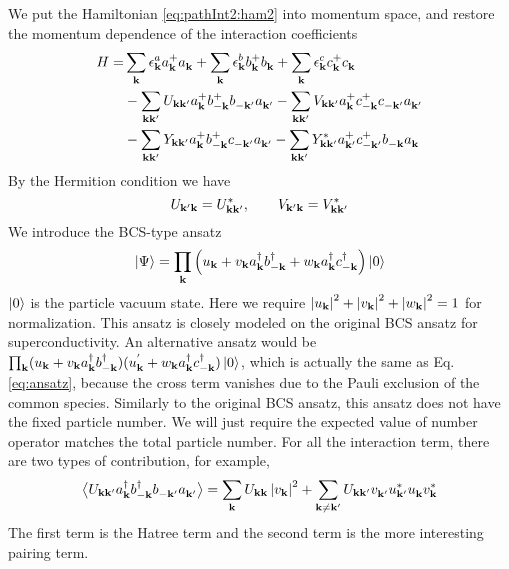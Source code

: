 We put the Hamiltonian \ref{eq:pathInt2:ham2} into momentum space, and restore the momentum dependence of the interaction coefficients
\begin{equation}\label{eq:uvw:hamiltonian}
\begin{split}
 H=&\sum_{\mathbf{k}}\epsilon^a_{\mathbf{k}}{}a^+_{\mathbf{k}}{}a^{}_{\mathbf{k}}+\sum_{\mathbf{k}}\epsilon^b_{\mathbf{k}}{}b^+_{\mathbf{k}}{}b^{}_{\mathbf{k}}+\sum_{\mathbf{k}}\epsilon^c_{\mathbf{k}}{}c^+_{\mathbf{k}}{}c^{}_{\mathbf{k}}\\
  &-\sum_{\mathbf{k}\mathbf{k}'}U_{\mathbf{k}\mathbf{k}'}a^+_{\mathbf{k}}{}b^+_{-\mathbf{k}}{}b^{}_{-\mathbf{k}'}a^{}_{\mathbf{k}'}
	-\sum_{\mathbf{k}\mathbf{k}'}V_{\mathbf{k}\mathbf{k}'}a^+_{\mathbf{k}}{}c^+_{-\mathbf{k}}{}c^{}_{-\mathbf{k}'}a^{}_{\mathbf{k}'}\\
 &-\sum_{\mathbf{k}\mathbf{k}'}Y_{\mathbf{k}\mathbf{k}'}a^+_{\mathbf{k}}{}b^+_{-\mathbf{k}}{}c^{}_{-\mathbf{k}'}a^{}_{\mathbf{k}'}
	-\sum_{\mathbf{k}\mathbf{k}'}Y^*_{\mathbf{k}\mathbf{k}'}a^+_{\mathbf{k}'}{}c^+_{-\mathbf{k}'}{}b^{}_{-\mathbf{k}}a^{}_{\mathbf{k}}
\end{split} 
\end{equation}
By the Hermition condition we have 
\begin{equation}
 U_{\mathbf{k}'\mathbf{k}}=U^*_{\mathbf{k}\mathbf{k}'},\qquad{} V_{\mathbf{k}'\mathbf{k}}=V^*_{\mathbf{k}\mathbf{k}'}
\end{equation}
  We introduce the BCS-type ansatz 
\begin{equation}\label{eq:ansatz}
 \left|\Psi\right>=\prod_{\mathbf{k}}\left(u_{\mathbf{k}}+v_{\mathbf{k}}{}a^{\dagger}_{\mathbf{k}}{}b^{\dagger}_{-\mathbf{k}}+w_{\mathbf{k}}{}a^{\dagger}_{\mathbf{k}}{}c^{\dagger}_{-\mathbf{k}}\right)\left|0\right>
\end{equation}
$\left|0\right>$ is the particle vacuum state.  Here we require $\left\lvert{u_{\ensuremath{\mathbf{k}}}}\right\rvert^2+\left\lvert{v_{\ensuremath{\mathbf{k}}}}\right\rvert^2+\left\lvert{w_{\ensuremath{\mathbf{k}}}}\right\rvert^2=1$ for normalization.  This ansatz is closely modeled on the original BCS ansatz for superconductivity.  An alternative ansatz would be $\prod_{\mathbf{k}}(u_{\mathbf{k}}+v_{\mathbf{k}}{}a^{\dagger}_{\mathbf{k}}{}b^{\dagger}_{-\mathbf{k}})(u^{'}_{\mathbf{k}}+w_{\mathbf{k}}{}a^{\dagger}_{\mathbf{k}}{}c^{\dagger}_{-\mathbf{k}})\left|0\right>$, which is actually the same as Eq. \ref{eq:ansatz}, because  the cross term vanishes due to the Pauli exclusion of the common species.   Similarly to the original BCS ansatz, this ansatz does not have the fixed particle number.  We  will just require the expected value of number operator matches the total particle number. For all the interaction term, there are two types of contribution,
for example, 
\begin{equation*}
\bigl<{U_{\mathbf{k}\mathbf{k}'}a^{\dagger}_{\mathbf{k}}{}b^{\dagger}_{-\mathbf{k}}{}b^{}_{-\mathbf{k}'}a^{}_{\mathbf{k}'}}\bigr>
=\sum_{\mathbf{k}}U_{\mathbf{k}\mathbf{k}}\left\lvert{v_{\ensuremath{\mathbf{k}}}}\right\rvert^2+\sum_{\mathbf{k}\neq\mathbf{k}'}U_{\mathbf{k}\mathbf{k}'}v^{}_{\mathbf{k}'}u^*_{\mathbf{k}'}u^{}_{\mathbf{k}}{}v^*_{\mathbf{k}}
\end{equation*}
The first term is the Hatree term and the second term is the more interesting pairing term.  


